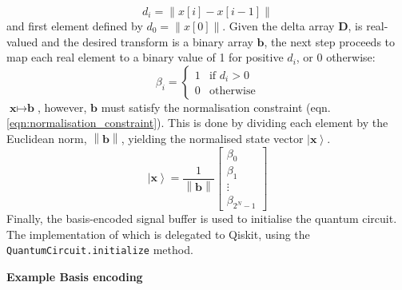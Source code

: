 \begin{equation}
    d_i = \lVert x[i] - x[i-1] \rVert
\end{equation}
% 
and first element defined by $d_0 = \lVert x[0] \rVert$.
% 
% 
Given the delta array $\textbf{D}$, is real-valued and the desired transform is a binary array $\textbf{b}$, the next step proceeds to map each real element to a binary value of 1 for positive $d_i$, or 0 otherwise:
% 
\begin{equation}
    \beta_i = \begin{cases}
        1 & \text{if } d_i > 0 \\
        0 & \text{otherwise}
    \end{cases}
\end{equation}
% 
% 
$\textbf{x} \mapsto \textbf{b}$, however, $\textbf{b}$ must satisfy the normalisation constraint (eqn. \ref{eqn:normalisation_constraint}).
This is done by dividing each element by the Euclidean norm, $\left\| \mathbf{b} \right\|$, yielding the normalised state vector $\left|\textbf{x}\right\rangle$.
% 
\begin{equation}
\displaystyle{
\left|\textbf{x}\right\rangle =
\frac{1}{\left\| \mathbf{b} \right\|}
\begin{bmatrix} \beta_0 \\ \beta_1 \\ \vdots \\ \beta_{2^N-1} \end{bmatrix}
}
\end{equation}
% 
Finally, the basis-encoded signal buffer is used to initialise the quantum circuit.
The implementation of which is delegated to Qiskit, using the \texttt{QuantumCircuit.initialize} method.

\textbf{Example Basis encoding}


